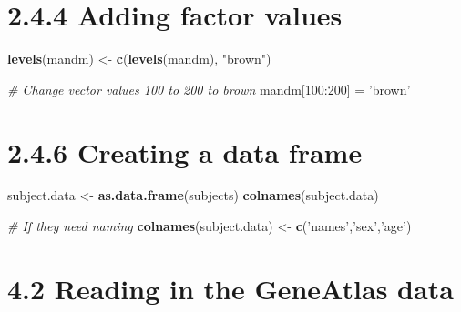 \documentclass[a4paper]{book}
\newenvironment{Shaded}{\begin{snugshade}}{\end{snugshade}}
\newcommand{\KeywordTok}[1]{\textcolor[rgb]{0.13,0.29,0.53}{\textbf{{#1}}}}
\newcommand{\DecValTok}[1]{\textcolor[rgb]{0.00,0.00,0.81}{{#1}}}
\newcommand{\StringTok}[1]{\textcolor[rgb]{0.31,0.60,0.02}{{#1}}}
\newcommand{\CommentTok}[1]{\textcolor[rgb]{0.56,0.35,0.01}{\textit{{#1}}}}
\newcommand{\NormalTok}[1]{{#1}}
\renewenvironment{Shaded}
{\vspace{1.5em}\begin{leftbar}\begin{snugshade}}
{\end{snugshade}\end{leftbar}\vspace{3pt}}
\begin{document}
\section*{2.4.4 Adding factor values}\label{adding-factor-values}

\begin{Shaded}
\begin{Highlighting}[]
\KeywordTok{levels}\NormalTok{(mandm) <-}\StringTok{ }\KeywordTok{c}\NormalTok{(}\KeywordTok{levels}\NormalTok{(mandm), }\StringTok{"brown"}\NormalTok{)}

\CommentTok{# Change vector values 100 to 200 to brown}
\NormalTok{mandm[}\DecValTok{100}\NormalTok{:}\DecValTok{200}\NormalTok{] =}\StringTok{ 'brown'}
\end{Highlighting}
\end{Shaded}

\section*{2.4.6 Creating a data frame}\label{creating-a-data-frame}

\begin{Shaded}
\begin{Highlighting}[]
\NormalTok{subject.data <-}\StringTok{ }\KeywordTok{as.data.frame}\NormalTok{(subjects)}
\KeywordTok{colnames}\NormalTok{(subject.data)}

\CommentTok{# If they need naming}
\KeywordTok{colnames}\NormalTok{(subject.data) <-}\StringTok{ }\KeywordTok{c}\NormalTok{(}\StringTok{'names'}\NormalTok{,}\StringTok{'sex'}\NormalTok{,}\StringTok{'age'}\NormalTok{)}
\end{Highlighting}
\end{Shaded}

\section*{4.2 Reading in the GeneAtlas
data}\label{reading-in-the-geneatlas-data}
\end{document}
